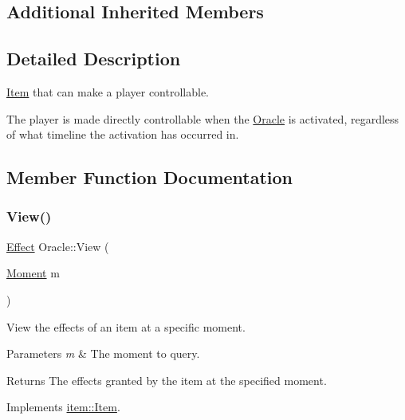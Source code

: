 \subsection*{Additional Inherited Members}


\subsection{Detailed Description}
\hyperlink{classitem_1_1_item}{Item} that can make a player controllable. 

The player is made directly controllable when the \hyperlink{classitem_1_1_oracle}{Oracle} is activated, regardless of what timeline the activation has occurred in. 

\subsection{Member Function Documentation}
\mbox{\label{classitem_1_1_oracle_a9982f1934a769cc461246bab31b8a72d}} 
\subsubsection{\texorpdfstring{View()}{View()}}
{\footnotesize\ttfamily \hyperlink{classitem_1_1_effect}{Effect} Oracle\+::\+View (\begin{DoxyParamCaption}\item[{\hyperlink{classtimeplane_1_1_moment}{Moment}}]{m }\end{DoxyParamCaption})\hspace{0.3cm}{\ttfamily [virtual]}}



View the effects of an item at a specific moment. 


\begin{DoxyParams}{Parameters}
{\em m} & The moment to query. \\
\hline
\end{DoxyParams}
\begin{DoxyReturn}{Returns}
The effects granted by the item at the specified moment. 
\end{DoxyReturn}


Implements \hyperlink{classitem_1_1_item_a400dfeabc4056d36bfd348ff9c51cf7d}{item\+::\+Item}.

\mbox{\label{classitem_1_1_oracle_a78dd3984a5a0dae432c86e18520d7c46}} 
